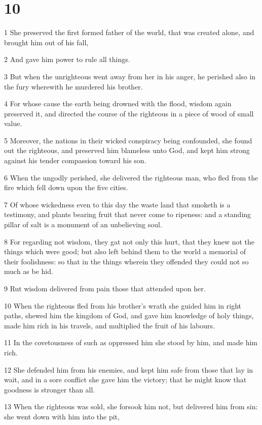 \chapter{10}

\par 1 She preserved the first formed father of the world, that was created alone, and brought him out of his fall,
\par 2 And gave him power to rule all things.
\par 3 But when the unrighteous went away from her in his anger, he perished also in the fury wherewith he murdered his brother.
\par 4 For whose cause the earth being drowned with the flood, wisdom again preserved it, and directed the course of the righteous in a piece of wood of small value.
\par 5 Moreover, the nations in their wicked conspiracy being confounded, she found out the righteous, and preserved him blameless unto God, and kept him strong against his tender compassion toward his son.
\par 6 When the ungodly perished, she delivered the righteous man, who fled from the fire which fell down upon the five cities.
\par 7 Of whose wickedness even to this day the waste land that smoketh is a testimony, and plants bearing fruit that never come to ripeness: and a standing pillar of salt is a monument of an unbelieving soul.
\par 8 For regarding not wisdom, they gat not only this hurt, that they knew not the things which were good; but also left behind them to the world a memorial of their foolishness: so that in the things wherein they offended they could not so much as be hid.
\par 9 Rut wisdom delivered from pain those that attended upon her.
\par 10 When the righteous fled from his brother's wrath she guided him in right paths, shewed him the kingdom of God, and gave him knowledge of holy things, made him rich in his travels, and multiplied the fruit of his labours.
\par 11 In the covetousness of such as oppressed him she stood by him, and made him rich.
\par 12 She defended him from his enemies, and kept him safe from those that lay in wait, and in a sore conflict she gave him the victory; that he might know that goodness is stronger than all.
\par 13 When the righteous was sold, she forsook him not, but delivered him from sin: she went down with him into the pit,
